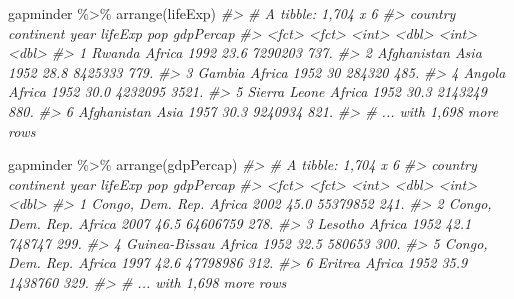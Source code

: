 \documentclass[
]{book}
\newenvironment{Shaded}{\begin{snugshade}}{\end{snugshade}}
\newcommand{\CommentTok}[1]{\textcolor[rgb]{0.56,0.35,0.01}{\textit{#1}}}
\newcommand{\FunctionTok}[1]{\textcolor[rgb]{0.00,0.00,0.00}{#1}}
\newcommand{\NormalTok}[1]{#1}
\newcommand{\SpecialCharTok}[1]{\textcolor[rgb]{0.00,0.00,0.00}{#1}}
\begin{document}
\begin{Shaded}
\begin{Highlighting}[]
\NormalTok{gapminder }\SpecialCharTok{\%\textgreater{}\%} \FunctionTok{arrange}\NormalTok{(lifeExp)}
\CommentTok{\#\textgreater{} \# A tibble: 1,704 x 6}
\CommentTok{\#\textgreater{}   country      continent  year lifeExp     pop gdpPercap}
\CommentTok{\#\textgreater{}   \textless{}fct\textgreater{}        \textless{}fct\textgreater{}     \textless{}int\textgreater{}   \textless{}dbl\textgreater{}   \textless{}int\textgreater{}     \textless{}dbl\textgreater{}}
\CommentTok{\#\textgreater{} 1 Rwanda       Africa     1992    23.6 7290203      737.}
\CommentTok{\#\textgreater{} 2 Afghanistan  Asia       1952    28.8 8425333      779.}
\CommentTok{\#\textgreater{} 3 Gambia       Africa     1952    30    284320      485.}
\CommentTok{\#\textgreater{} 4 Angola       Africa     1952    30.0 4232095     3521.}
\CommentTok{\#\textgreater{} 5 Sierra Leone Africa     1952    30.3 2143249      880.}
\CommentTok{\#\textgreater{} 6 Afghanistan  Asia       1957    30.3 9240934      821.}
\CommentTok{\#\textgreater{} \# ... with 1,698 more rows}
\end{Highlighting}
\end{Shaded}

\begin{Shaded}
\begin{Highlighting}[]
\NormalTok{gapminder }\SpecialCharTok{\%\textgreater{}\%} \FunctionTok{arrange}\NormalTok{(gdpPercap)}
\CommentTok{\#\textgreater{} \# A tibble: 1,704 x 6}
\CommentTok{\#\textgreater{}   country          continent  year lifeExp      pop gdpPercap}
\CommentTok{\#\textgreater{}   \textless{}fct\textgreater{}            \textless{}fct\textgreater{}     \textless{}int\textgreater{}   \textless{}dbl\textgreater{}    \textless{}int\textgreater{}     \textless{}dbl\textgreater{}}
\CommentTok{\#\textgreater{} 1 Congo, Dem. Rep. Africa     2002    45.0 55379852      241.}
\CommentTok{\#\textgreater{} 2 Congo, Dem. Rep. Africa     2007    46.5 64606759      278.}
\CommentTok{\#\textgreater{} 3 Lesotho          Africa     1952    42.1   748747      299.}
\CommentTok{\#\textgreater{} 4 Guinea{-}Bissau    Africa     1952    32.5   580653      300.}
\CommentTok{\#\textgreater{} 5 Congo, Dem. Rep. Africa     1997    42.6 47798986      312.}
\CommentTok{\#\textgreater{} 6 Eritrea          Africa     1952    35.9  1438760      329.}
\CommentTok{\#\textgreater{} \# ... with 1,698 more rows}
\end{Highlighting}
\end{Shaded}
\end{document}
